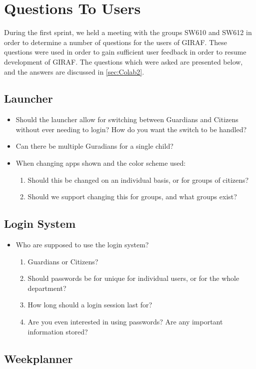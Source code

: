 \chapter{Questions To Users}
During the first sprint, we held a meeting with the groups SW610 and SW612 in
order to determine a number of questions for the users of GIRAF. These questions
were used in order to gain sufficient user feedback in order to resume
development of GIRAF. The questions which were asked are presented below, and
the answers are discussed in \autoref{sec:Colab2}.

\section{Launcher}
\begin{itemize}
  \item Should the launcher allow for switching between Guardians and Citizens
  without ever needing to login? How do you want the switch to be handled?
  \item Can there be multiple Guradians for a single child?
  \item When changing apps shown and the color scheme used:
  	\begin{enumerate}
  	\item Should this be changed on an individual basis, or for groups of
  	citizens?
  	\item Should we support changing this for groups, and what groups exist?
	\end{enumerate}
\end{itemize}

\section{Login System}
\begin{itemize}
  \item Who are supposed to use the login system?
  	\begin{enumerate}
  	\item Guardians or Citizens?
  	\item Should passwords be for unique for individual users, or for the whole
  	department?
  	\item How long should a login session last for?
  	\item Are you even interested in using passwords? Are any important
  	information stored?
	\end{enumerate}
\end{itemize}

\section{Weekplanner}
